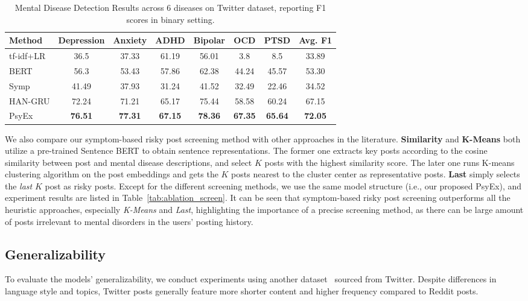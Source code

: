 \begin{table}[th]
    \small
    \centering
    \begin{tabular}{l|cccccc|c}
    \hline
    Method & Depression & Anxiety & ADHD & Bipolar & OCD & PTSD & Avg. F1 \\ 
    \hline
    tf-idf+LR	&36.5	&37.33	&61.19	&56.01	&3.8	&8.5	&33.89 \\
    BERT	&56.3	&53.43	&57.86	&62.38	&44.24	&45.57	&53.30 \\
    Symp	&41.49	&37.93	&31.24	&41.52	&32.49	&22.46	&34.52 \\
    HAN-GRU	&72.24	&71.21	&65.17	&75.44	&58.58	&60.24	&67.15 \\
    \hline
    PsyEx	&\textbf{76.51}	&\textbf{77.31}	&\textbf{67.15}	&\textbf{78.36}	&\textbf{67.35}	&\textbf{65.64}	&\textbf{72.05} \\
    \hline
    \end{tabular}
    \caption{Mental Disease Detection Results across 6 diseases on Twitter dataset, reporting F1 scores in binary setting.}
    \label{tab:disease_twitter}
\end{table}

We also compare our symptom-based risky post screening method with other approaches in the literature.  \textbf{Similarity} and \textbf{K-Means} both utilize a pre-trained Sentence BERT \cite{reimers-2019-sentence-bert} to obtain sentence representations. The former one extracts key posts according to the cosine similarity between post and mental disease descriptions, and select $K$ posts with the highest similarity score. The later one runs K-means clustering algorithm on the post embeddings and gets the $K$ posts nearest to the cluster center as representative posts. \textbf{Last} simply selects the \textit{last} $K$ post as risky posts. Except for the different screening methods, we use the same model structure (i.e., our proposed PsyEx), and experiment results are listed in Table~\ref{tab:ablation_screen}. 
It can be seen that symptom-based risky post screening outperforms all the heuristic approaches, especially \textit{K-Means} and \textit{Last}, highlighting the importance of a precise screening method, as there can be large amount of posts irrelevant to mental disorders in the users' posting history. 



\subsection{Generalizability}
To evaluate the models' generalizability, we conduct experiments using another dataset~\cite{Singh2022twitter} sourced from Twitter. Despite differences in language style and topics, Twitter posts generally feature more shorter content and higher frequency compared to Reddit posts.


